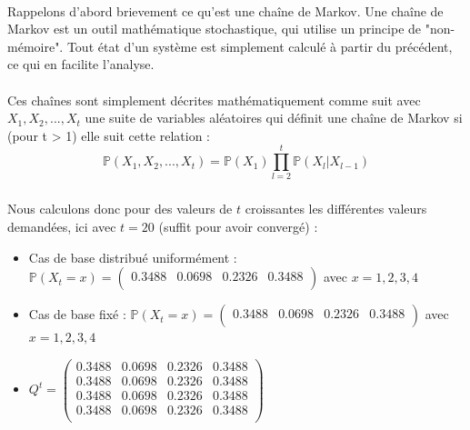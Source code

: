 \paragraph{}
Rappelons d'abord brievement ce qu'est une chaîne de Markov. Une chaîne de Markov est un outil mathématique stochastique, qui utilise un principe de "non-mémoire". Tout état d'un système est simplement calculé à partir du précédent, ce qui en facilite l'analyse.
\\\\
Ces chaînes sont simplement décrites mathématiquement comme suit avec $X_1, X_2,..., X_t$ une suite de variables aléatoires qui définit une chaîne de Markov
si (pour t > 1) elle suit cette relation :
\begin{equation*}
  \mathbb{P}(X_1, X_2, ..., X_t) = \mathbb{P}(X_1)\prod_{l = 2}^{t}\mathbb{P}(X_l | X_{l-1}) 
\end{equation*}

\subsubsection{}

Nous calculons donc pour des valeurs de $t$ croissantes les différentes valeurs demandées, ici avec $t = 20$ (suffit pour avoir convergé) :
\begin{itemize}
  \item Cas de base distribué uniformément : $\mathbb{P}(X_t = x) = 
  \begin{pmatrix}
    0.3488 & 0.0698 & 0.2326 & 0.3488\\
  \end{pmatrix}$ avec $x = 1, 2, 3, 4$
  \item Cas de base fixé : $\mathbb{P}(X_t = x) = 
  \begin{pmatrix}
    0.3488 & 0.0698 & 0.2326 & 0.3488\\
  \end{pmatrix}$ avec $x = 1, 2, 3, 4$
  \item $Q^t = 
  \begin{pmatrix}
  0.3488 & 0.0698 & 0.2326 & 0.3488\\
  0.3488 & 0.0698 & 0.2326 & 0.3488\\
  0.3488 & 0.0698 & 0.2326 & 0.3488\\
  0.3488 & 0.0698 & 0.2326 & 0.3488\\
  \end{pmatrix}$ 
\end{itemize}

